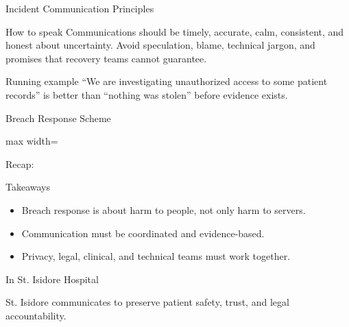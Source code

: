 \documentclass[presentation]{beamer}
\newcommand{\scenario}{St. Isidore Hospital}
\newcommand{\takeawaysframe}[2]{
\begin{frame}[c]{Recap: \insertsection}
\begin{block}{Takeaways}
#1
\end{block}
\begin{exampleblock}{In \scenario}
#2
\end{exampleblock}
\end{frame}
}
\begin{document}
\begin{frame}[c]{Incident Communication Principles}
\begin{block}{How to speak}
Communications should be timely, accurate, calm, consistent, and honest about uncertainty. Avoid
speculation, blame, technical jargon, and promises that recovery teams cannot guarantee.
\end{block}

\begin{exampleblock}{Running example}
``We are investigating unauthorized access to some patient records'' is better than ``nothing was
stolen'' before evidence exists.
\end{exampleblock}
\end{frame}

\begin{frame}[c]{Breach Response Scheme}
\begin{center}
\begin{adjustbox}{max width=\textwidth}
\end{adjustbox}
\end{center}
\end{frame}

\takeawaysframe{
\begin{itemize}
    \item Breach response is about harm to people, not only harm to servers.
    \item Communication must be coordinated and evidence-based.
    \item Privacy, legal, clinical, and technical teams must work together.
\end{itemize}
}{
St. Isidore communicates to preserve patient safety, trust, and legal accountability.
}
\end{document}

